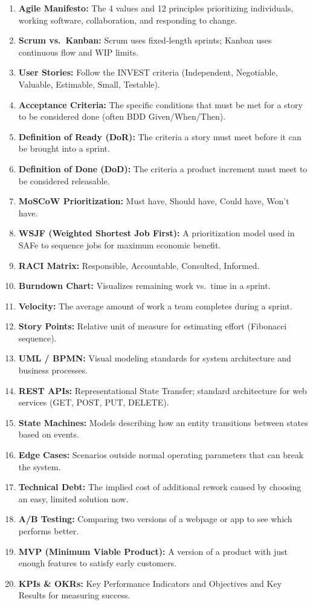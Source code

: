 \begin{enumerate}
\def\labelenumi{\arabic{enumi}.}
\tightlist
\item
  \textbf{Agile Manifesto:} The 4 values and 12 principles prioritizing
  individuals, working software, collaboration, and responding to
  change.
\item
  \textbf{Scrum vs.~Kanban:} Scrum uses fixed-length sprints; Kanban
  uses continuous flow and WIP limits.
\item
  \textbf{User Stories:} Follow the INVEST criteria (Independent,
  Negotiable, Valuable, Estimable, Small, Testable).
\item
  \textbf{Acceptance Criteria:} The specific conditions that must be met
  for a story to be considered done (often BDD Given/When/Then).
\item
  \textbf{Definition of Ready (DoR):} The criteria a story must meet
  before it can be brought into a sprint.
\item
  \textbf{Definition of Done (DoD):} The criteria a product increment
  must meet to be considered releasable.
\item
  \textbf{MoSCoW Prioritization:} Must have, Should have, Could have,
  Won't have.
\item
  \textbf{WSJF (Weighted Shortest Job First):} A prioritization model
  used in SAFe to sequence jobs for maximum economic benefit.
\item
  \textbf{RACI Matrix:} Responsible, Accountable, Consulted, Informed.
\item
  \textbf{Burndown Chart:} Visualizes remaining work vs.~time in a
  sprint.
\item
  \textbf{Velocity:} The average amount of work a team completes during
  a sprint.
\item
  \textbf{Story Points:} Relative unit of measure for estimating effort
  (Fibonacci sequence).
\item
  \textbf{UML / BPMN:} Visual modeling standards for system architecture
  and business processes.
\item
  \textbf{REST APIs:} Representational State Transfer; standard
  architecture for web services (GET, POST, PUT, DELETE).
\item
  \textbf{State Machines:} Models describing how an entity transitions
  between states based on events.
\item
  \textbf{Edge Cases:} Scenarios outside normal operating parameters
  that can break the system.
\item
  \textbf{Technical Debt:} The implied cost of additional rework caused
  by choosing an easy, limited solution now.
\item
  \textbf{A/B Testing:} Comparing two versions of a webpage or app to
  see which performs better.
\item
  \textbf{MVP (Minimum Viable Product):} A version of a product with
  just enough features to satisfy early customers.
\item
  \textbf{KPIs \& OKRs:} Key Performance Indicators and Objectives and
  Key Results for measuring success.
\end{enumerate}

